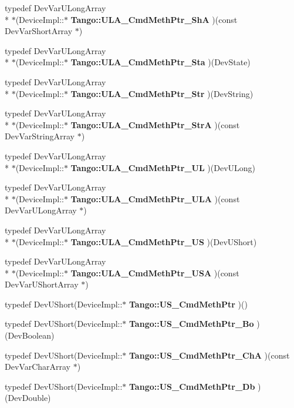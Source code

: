 \begin{DoxyCompactItemize}
\item 
typedef Dev\-Var\-U\-Long\-Array \\*
$\ast$(Device\-Impl\-::$\ast$ {\bf Tango\-::\-U\-L\-A\-\_\-\-Cmd\-Meth\-Ptr\-\_\-\-Sh\-A} )(const Dev\-Var\-Short\-Array $\ast$)
\item 
typedef Dev\-Var\-U\-Long\-Array \\*
$\ast$(Device\-Impl\-::$\ast$ {\bf Tango\-::\-U\-L\-A\-\_\-\-Cmd\-Meth\-Ptr\-\_\-\-Sta} )(Dev\-State)
\item 
typedef Dev\-Var\-U\-Long\-Array \\*
$\ast$(Device\-Impl\-::$\ast$ {\bf Tango\-::\-U\-L\-A\-\_\-\-Cmd\-Meth\-Ptr\-\_\-\-Str} )(Dev\-String)
\item 
typedef Dev\-Var\-U\-Long\-Array \\*
$\ast$(Device\-Impl\-::$\ast$ {\bf Tango\-::\-U\-L\-A\-\_\-\-Cmd\-Meth\-Ptr\-\_\-\-Str\-A} )(const Dev\-Var\-String\-Array $\ast$)
\item 
typedef Dev\-Var\-U\-Long\-Array \\*
$\ast$(Device\-Impl\-::$\ast$ {\bf Tango\-::\-U\-L\-A\-\_\-\-Cmd\-Meth\-Ptr\-\_\-\-U\-L} )(Dev\-U\-Long)
\item 
typedef Dev\-Var\-U\-Long\-Array \\*
$\ast$(Device\-Impl\-::$\ast$ {\bf Tango\-::\-U\-L\-A\-\_\-\-Cmd\-Meth\-Ptr\-\_\-\-U\-L\-A} )(const Dev\-Var\-U\-Long\-Array $\ast$)
\item 
typedef Dev\-Var\-U\-Long\-Array \\*
$\ast$(Device\-Impl\-::$\ast$ {\bf Tango\-::\-U\-L\-A\-\_\-\-Cmd\-Meth\-Ptr\-\_\-\-U\-S} )(Dev\-U\-Short)
\item 
typedef Dev\-Var\-U\-Long\-Array \\*
$\ast$(Device\-Impl\-::$\ast$ {\bf Tango\-::\-U\-L\-A\-\_\-\-Cmd\-Meth\-Ptr\-\_\-\-U\-S\-A} )(const Dev\-Var\-U\-Short\-Array $\ast$)
\item 
typedef Dev\-U\-Short(Device\-Impl\-::$\ast$ {\bf Tango\-::\-U\-S\-\_\-\-Cmd\-Meth\-Ptr} )()
\item 
typedef Dev\-U\-Short(Device\-Impl\-::$\ast$ {\bf Tango\-::\-U\-S\-\_\-\-Cmd\-Meth\-Ptr\-\_\-\-Bo} )(Dev\-Boolean)
\item 
typedef Dev\-U\-Short(Device\-Impl\-::$\ast$ {\bf Tango\-::\-U\-S\-\_\-\-Cmd\-Meth\-Ptr\-\_\-\-Ch\-A} )(const Dev\-Var\-Char\-Array $\ast$)
\item 
typedef Dev\-U\-Short(Device\-Impl\-::$\ast$ {\bf Tango\-::\-U\-S\-\_\-\-Cmd\-Meth\-Ptr\-\_\-\-Db} )(Dev\-Double)
\item 

\end{DoxyCompactItemize}
